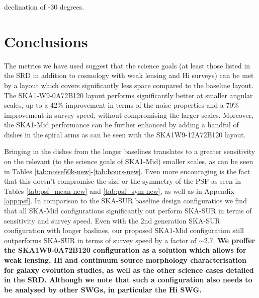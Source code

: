 \documentclass[sfheadings,a4paper,times,9pt,floats,floatfix]{article}
\begin{document}
declination of -30 degrees.









 
\newpage
\section{Conclusions}\label{sec:conclusion}
The metrics we have used suggest that the science goals (at least those listed in the SRD in addition to cosmology with weak
lensing and H{\sc i} surveys) can be met by a layout which covers significantly less space compared to the baseline layout. The
SKA1-W9-0A72B120 layout performs significantly better at smaller angular scales, up to a 42\% improvement in terms of the noise
properties and a 70\% improvement in survey speed, without compromising the larger scales. Moreover, the SKA1-Mid performance can
be further enhanced by adding a handful of dishes in the spiral arms as can be seen
with the SKA1W9-12A72B120 layout.

Bringing in the dishes from the longer baselines translates to a greater sensitivity on the relevant (to the
science goals of SKA1-Mid) smaller scales, as can be seen in Tables \ref{tab:noise50k-new}-\ref{tab:hours-new}. Even
more encouraging is
the fact that this doesn't compromise the size or the symmetry of the PSF as seen in Tables \ref{tab:psf_mean-new} and
\ref{tab:psf_sym-new}, as well as in Appendix \ref{app:psf}. 
In comparison to the SKA-SUR baseline design configuratios we find that all
SKA-Mid configurations significantly out perform SKA-SUR in terms of
sensitivity and survey speed. Even with the 2nd generation SKA-SUR
configuration with longer baslines, our proposed SKA1-Mid configuration
still outperforms SKA-SUR in terms of survey speed by a factor of
$\sim 2.7$.
{\bf We proffer the SKA1W9-0A72B120 configuration as a solution
which allows for weak lensing, H{\sc i}
and continuum source morphology characterisation for galaxy evolution studies, as well as the other science cases detailed in the
SRD. Although we note that such a configuration also needs to be
analysed by other SWGs, in particular the H{\sc i} SWG.}
\end{document}
